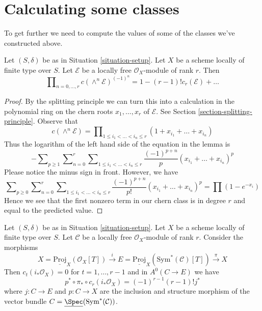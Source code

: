 \section{Calculating some classes}
\label{section-calculate}

\noindent
To get further we need to compute the values of some of the
classes we've constructed above.

\begin{lemma}
\label{lemma-compute-koszul}
Let $(S, \delta)$ be as in Situation \ref{situation-setup}. Let $X$
be a scheme locally of finite type over $S$. Let $\mathcal{E}$
be a locally free $\mathcal{O}_X$-module of rank $r$.
Then
$$
\prod\nolimits_{n = 0, \ldots, r} c(\wedge^n \mathcal{E})^{(-1)^n} =
1 - (r - 1)! c_r(\mathcal{E}) + \ldots
$$
\end{lemma}

\begin{proof}
By the splitting principle we can turn this into a calculation in the
polynomial ring on the chern roots $x_1, \ldots, x_r$ of $\mathcal{E}$. See
Section \ref{section-splitting-principle}. Observe that
$$
c(\wedge^n \mathcal{E}) =
\prod\nolimits_{1 \leq i_1 < \ldots < i_n \leq r}
(1 + x_{i_1} + \ldots + x_{i_n})
$$
Thus the logarithm of the left hand side of the equation in the lemma is
$$
-
\sum\nolimits_{p \geq 1}
\sum\nolimits_{n = 0}^r
\sum\nolimits_{1 \leq i_1 < \ldots < i_n \leq r}
\frac{(-1)^{p + n}}{p}(x_{i_1} + \ldots + x_{i_n})^p
$$
Please notice the minus sign in front. However, we have
$$
\sum\nolimits_{p \geq 0}
\sum\nolimits_{n = 0}^r
\sum\nolimits_{1 \leq i_1 < \ldots < i_n \leq r}
\frac{(-1)^{p + n}}{p!}(x_{i_1} + \ldots + x_{i_n})^p
=
\prod (1 - e^{-x_i})
$$
Hence we see that the first nonzero term in our chern class
is in degree $r$ and equal to the predicted value.
\end{proof}

\begin{lemma}
\label{lemma-compute-section}
Let $(S, \delta)$ be as in Situation \ref{situation-setup}. Let $X$
be a scheme locally of finite type over $S$. Let $\mathcal{C}$
be a locally free $\mathcal{O}_X$-module of rank $r$. Consider the
morphisms
$$
X = \underline{\text{Proj}}_X(\mathcal{O}_X[T])
\xrightarrow{i}
E = \underline{\text{Proj}}_X(\text{Sym}^*(\mathcal{C})[T])
\xrightarrow{\pi}
X
$$
Then $c_t(i_*\mathcal{O}_X) = 0$ for $t = 1, \ldots, r - 1$ and in
$A^0(C \to E)$ we have
$$
p^* \circ \pi_* \circ c_r(i_*\mathcal{O}_X) = (-1)^{r - 1}(r - 1)! j^*
$$
where
$j : C \to E$ and $p : C \to X$ are the inclusion and structure
morphism of the vector bundle
$C = \underline{\Spec}(\text{Sym}^*(\mathcal{C}))$.
\end{lemma}

